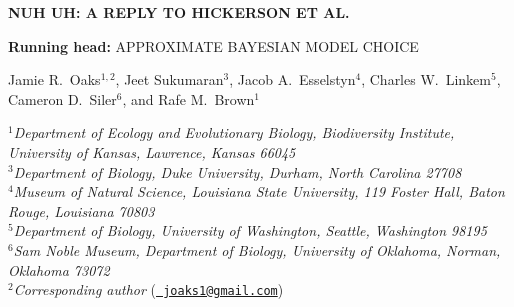 \documentclass[letterpaper,12pt]{article}
\newcommand{\msTitle}{Nuh uh: A reply to Hickerson et al.
\xspace}
\begin{document}
\doublespacing
\raggedright
\setlength{\parindent}{0.5in}
\begin{linenumbers}

\begin{titlepage}
    \begin{flushleft}
        \sffamily

        \MakeUppercase{\large\bfseries \msTitle}

        \vspace{12pt}
        \textbf{Running head:} \MakeUppercase{Approximate Bayesian model
        choice}

        \vspace{12pt}
        Jamie R.\ Oaks$^{1,2}$, Jeet Sukumaran$^{3}$, Jacob A.\
        Esselstyn$^{4}$, Charles W.\ Linkem$^{5}$, Cameron D.\
        Siler$^{6}$, and Rafe M.\ Brown$^{1}$

        \bigskip
        $^1$\emph{Department of Ecology and Evolutionary Biology,
            Biodiversity Institute,
            University of Kansas,
            Lawrence, Kansas 66045}\\[.1in]
        $^3$\emph{Department of Biology,
            Duke University,
            Durham, North Carolina 27708} \\[.1in]
        $^4$\emph{Museum of Natural Science,
            Louisiana State University,
            119 Foster Hall,
            Baton Rouge, Louisiana 70803}\\[.1in]
        $^5$\emph{Department of Biology,
            University of Washington,
            Seattle, Washington 98195}\\[.1in]
        $^6$\emph{Sam Noble Museum,
            Department of Biology,
            University of Oklahoma,
            Norman, Oklahoma 73072}\\[.1in]
        $^2$\emph{Corresponding author} (\href{mailto:joaks1@gmail.com}{\tt
        joaks1@gmail.com})\\

    \end{flushleft}
\end{titlepage}


\end{linenumbers}
\end{document}

